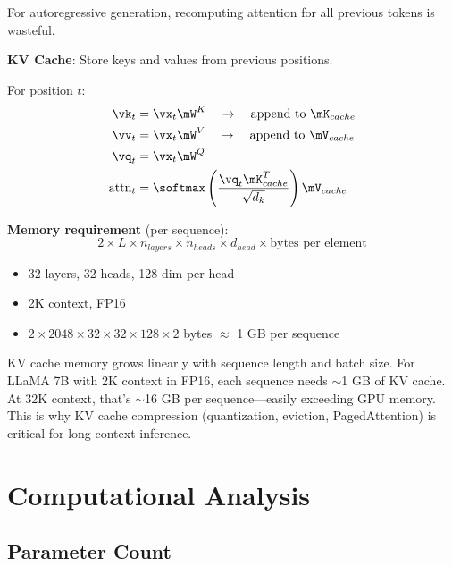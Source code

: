 For autoregressive generation, recomputing attention for all previous tokens is wasteful.

\textbf{KV Cache}: Store keys and values from previous positions.

For position $t$:
\begin{align}
\vk_t &= \vx_t \mW^K \quad \to \quad \text{append to } \mK_{cache} \\
\vv_t &= \vx_t \mW^V \quad \to \quad \text{append to } \mV_{cache} \\
\vq_t &= \vx_t \mW^Q \\
\text{attn}_t &= \softmax\left(\frac{\vq_t \mK_{cache}^T}{\sqrt{d_k}}\right) \mV_{cache}
\end{align}

\textbf{Memory requirement} (per sequence):
\begin{equation}
2 \times L \times n_{layers} \times n_{heads} \times d_{head} \times \text{bytes per element}
\end{equation}

\begin{example}
\begin{itemize}
    \item 32 layers, 32 heads, 128 dim per head
    \item 2K context, FP16
    \item $2 \times 2048 \times 32 \times 32 \times 128 \times 2$ bytes $\approx$ 1 GB per sequence
\end{itemize}
\end{example}

\begin{warningbox}
KV cache memory grows linearly with sequence length and batch size. For LLaMA 7B with 2K context in FP16, each sequence needs $\sim$1 GB of KV cache. At 32K context, that's $\sim$16 GB per sequence---easily exceeding GPU memory. This is why KV cache compression (quantization, eviction, PagedAttention) is critical for long-context inference.
\end{warningbox}

\section{Computational Analysis}
\label{sec:transformer_compute}

\subsection{Parameter Count}

